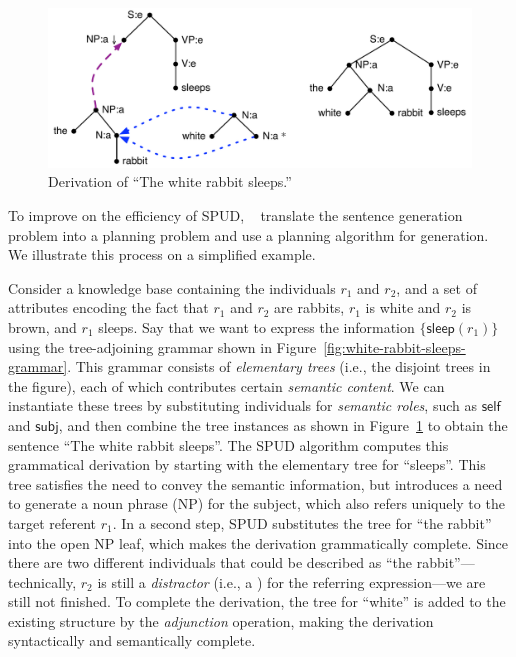 \begin{figure}
  \centering
  \includegraphics[width=\columnwidth]{pic-derivation}
  \caption{Derivation of ``The white rabbit sleeps.''}
  \label{fig:white-rabbit-sleeps-deriv}
\end{figure}


To improve on the efficiency of SPUD,
\citeauthor{KolSto07}~ translate the sentence
generation problem into a planning problem and use a planning algorithm for
generation. We illustrate this process on a simplified example.

Consider a knowledge base containing the individuals $r_1$ and $r_2$, and a
set of attributes encoding the fact that $r_1$ and $r_2$ are rabbits, $r_1$
is white and $r_2$ is brown, and $r_1$ sleeps.  Say that we want to express
the information $\{\mathsf{sleep}(r_1)\}$ using the tree-adjoining grammar
shown in Figure~\ref{fig:white-rabbit-sleeps-grammar}. This grammar consists
of \emph{elementary trees} (i.e., the disjoint trees in the figure), each
of which contributes certain \emph{semantic content}. We can instantiate
these trees by substituting individuals for \emph{semantic roles}, such as
$\mathsf{self}$ and $\mathsf{subj}$, and then combine the tree instances as
shown in Figure~\ref{fig:white-rabbit-sleeps-deriv} to obtain the sentence
``The white rabbit sleeps''. The SPUD algorithm computes this grammatical
derivation by starting with the elementary tree for ``sleeps''. This tree
satisfies the need to convey the semantic information, but introduces a
need to generate a noun phrase (NP) for the subject, which also refers
uniquely to the target referent $r_1$. In a second step, SPUD substitutes
the tree for ``the rabbit'' into the open NP leaf, which makes the
derivation grammatically complete. Since there are two different
individuals that could be described as ``the rabbit''---technically, $r_2$
is still a \emph{distractor} (i.e., a ) for
the referring expression---we are still not finished. To complete the
derivation, the tree for ``white'' is added to the existing structure by
the \emph{adjunction} operation, making the derivation syntactically and
semantically complete.


